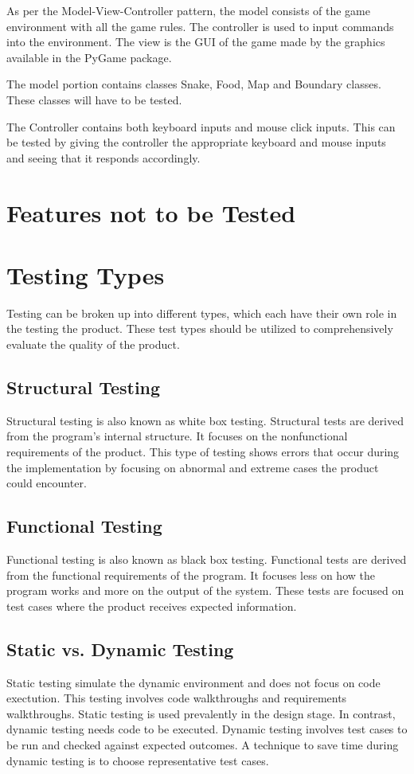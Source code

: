 \documentclass[12pt]{article}
\begin{document}
As per the Model-View-Controller pattern, the model consists of the game environment with all the game rules. The controller is used to input commands into the environment. The view is the GUI of the game made by the graphics available in the PyGame package.

The model portion contains classes Snake, Food, Map and Boundary classes. These classes will have to be tested.

The Controller contains both keyboard inputs and mouse click inputs. This can be tested by giving the controller the appropriate keyboard and mouse inputs and seeing that it responds accordingly.

\section{Features not to be Tested}



\section{Testing Types}
Testing can be broken up into different types, which each have their own role in the testing the product. These test types should be utilized to comprehensively evaluate the quality of the product.
\subsection{Structural Testing}
Structural testing  is also known as white box testing. Structural tests are derived from the program's internal structure. It focuses on the nonfunctional requirements of the product. This type of testing shows errors that occur during the implementation by focusing on abnormal and extreme cases the product could encounter.
\subsection{Functional Testing}
Functional testing is also known as black box testing. Functional tests are derived from the functional requirements of the program. It focuses less on how the program works and more on the output of the system. These tests are focused on test cases where the product receives expected information.
\subsection{Static vs. Dynamic Testing}
Static testing simulate the dynamic environment and does not focus on code exectution. This testing involves code walkthroughs and requirements walkthroughs. Static testing is used prevalently in the design stage. In contrast, dynamic testing needs code to be executed. \newline\newline
Dynamic testing involves test cases to be run and checked against expected outcomes. A technique to save time during dynamic testing is to choose representative test cases. 
\end{document}
